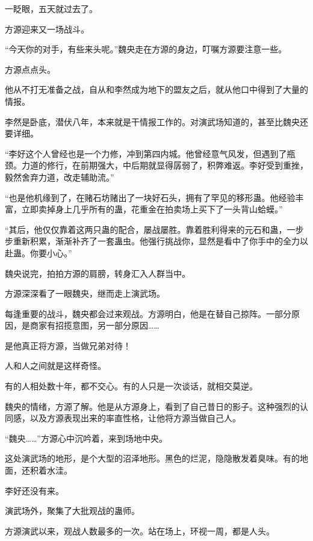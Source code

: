 
\begin{this_body}



一眨眼，五天就过去了。

方源迎来又一场战斗。

“今天你的对手，有些来头呢。”魏央走在方源的身边，叮嘱方源要注意一些。

方源点点头。

他从不打无准备之战，自从和李然成为地下的盟友之后，就从他口中得到了大量的情报。

李然是卧底，潜伏八年，本来就是干情报工作的。对演武场知道的，甚至比魏央还要详细。

“李好这个人曾经也是一个力修，冲到第四内城。他曾经意气风发，但遇到了瓶颈。力道的修行，在前期强大，中后期就显得孱弱了，积弊难返。李好受到重挫，毅然舍弃力道，改走辅助流。”

“也是他机缘到了，在赌石坊赌出了一块好石头，拥有了罕见的移形蛊。他经验丰富，立即卖掉身上几乎所有的蛊，花重金在拍卖场上买下了一头背山蛤蟆。”

“其后，他仅仅靠着这两只蛊的配合，屡战屡胜。靠着胜利得来的元石和蛊，一步步重新积累，渐渐补齐了一套蛊虫。他强行挑战你，显然是看中了你手中的全力以赴蛊。你要小心。”

魏央说完，拍拍方源的肩膀，转身汇入人群当中。

方源深深看了一眼魏央，继而走上演武场。

每逢重要的战斗，魏央都会过来观战。方源明白，他是在替自己掠阵。一部分原因，是商家有招揽意图，另一部分原因……

是他真正将方源，当做兄弟对待！

人和人之间就是这样奇怪。

有的人相处数十年，都不交心。有的人只是一次谈话，就相交莫逆。

魏央的情绪，方源了解。他是从方源身上，看到了自己昔日的影子。这种强烈的认同感，以及方源表现出来的率直性格，让他将方源当做自己人。

“魏央……”方源心中沉吟着，来到场地中央。

这处演武场的地形，是个大型的沼泽地形。黑色的烂泥，隐隐散发着臭味。有的地面，还积着水洼。

李好还没有来。

演武场外，聚集了大批观战的蛊师。

方源演武以来，观战人数最多的一次。站在场上，环视一周，都是人头。


\end{this_body}
